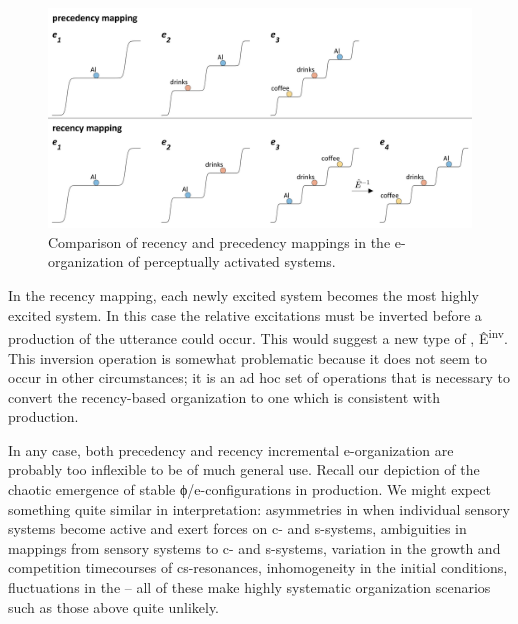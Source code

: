   
\begin{figure}
\includegraphics[width=\textwidth]{figures/Tilsen-img128.png}
\caption{Comparison of recency and precedency mappings in the e-organization of perceptually activated systems.}
\label{fig:6:9}
\end{figure}
 

  In the recency mapping, each newly excited system becomes the most highly excited system. In this case the relative excitations must be inverted before a production of the utterance could occur. This would suggest a new type of , Ê\textsuperscript{{}inv}. This inversion operation is somewhat problematic because it does not seem to occur in other circumstances; it is an ad hoc set of operations that is necessary to convert the recency-based organization to one which is consistent with production.

  In any case, both precedency and recency incremental e-organization are probably too inflexible to be of much general use. Recall our depiction of the chaotic emergence of stable ϕ/e-configurations in production. We might expect something quite similar in interpretation: asymmetries in when individual sensory systems become active and exert forces on c- and s-systems, ambiguities in mappings from sensory systems to c- and s-systems, variation in the growth and competition timecourses of cs-resonances, inhomogeneity in the initial conditions, fluctuations in the  -- all of these make highly systematic organization scenarios such as those above quite unlikely.


